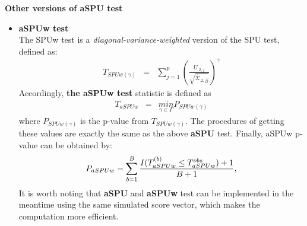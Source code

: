 \documentclass[12pt]{article}
\begin{document}
\textbf{Other versions of aSPU test}
\begin{itemize}
\item \textbf{aSPUw test}\\
The SPUw test is a \textit{diagonal-variance-weighted} version of the SPU test, defined as:
\begin{eqnarray*}
T_{SPUw(\gamma)} & = & \sum_{j=1}^{p}\left(\frac{U_{.2,j}}{\sqrt{\hat{\Sigma}_{.2,jj}}}\right)^{\gamma}
\end{eqnarray*}
Accordingly, \textbf{the aSPUw test} statistic is defined as
\begin{eqnarray*}
T_{aSPUw} & = & \underset{\gamma\in\Gamma}{min}P_{SPUw(\gamma)}
\end{eqnarray*}
where $P_{SPUw(\gamma)}$ is the p-value from $T_{SPUw(\gamma)}$. The procedures of getting these values are exactly the same as the above \textbf{aSPU} test. Finally, aSPUw p-value can be obtained by:
$$
P_{aSPUw} = \sum_{b=1}^B { I(T ^ {(b)} _{aSPUw} \leq T ^ {obs} _{aSPUw} ) + 1  \over B + 1 },
$$
It is worth noting that \textbf{aSPU} and \textbf{aSPUw} test can be implemented in the meantime using the same simulated score vector, which makes the computation more efficient.

%


\end{itemize}
\end{document}
